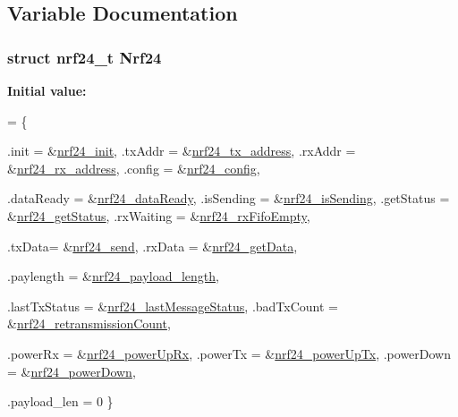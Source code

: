 \subsection{Variable Documentation}
\hypertarget{a00013_a3af53c3fdae3f9bf7246b30d2d66259f}{
\subsubsection[{Nrf24}]{\setlength{\rightskip}{0pt plus 5cm}struct {\bf nrf24\-\_\-t} Nrf24\hspace{0.3cm}{\ttfamily [static]}}}\label{a00013_a3af53c3fdae3f9bf7246b30d2d66259f}
{\bfseries Initial value\-:}
\begin{DoxyCode}
= \{
  
  .init =   &\hyperlink{a00013_a74436d4829a431fcd9b5ef6ff76d0677}{nrf24\_init},
  .txAddr = &\hyperlink{a00013_a17831f7445d7a64fc5f993cb8661ccaa}{nrf24\_tx\_address},
  .rxAddr = &\hyperlink{a00013_a828f90ed30594cc2c29272ce3a0345db}{nrf24\_rx\_address},
  .config = &\hyperlink{a00013_a97793f0c66a9d83e7180e54b6054e366}{nrf24\_config},

  
  .dataReady = &\hyperlink{a00013_a712c0b5e8c339da2e8f36cfbba8892ac}{nrf24\_dataReady},
  .isSending = &\hyperlink{a00013_a126be099971800e98c2c0b0fa6910051}{nrf24\_isSending},
  .getStatus = &\hyperlink{a00013_ab1cbb7a5d39d2d1389156e88d10ff85b}{nrf24\_getStatus},
  .rxWaiting = &\hyperlink{a00013_a9e05723f5fa753cfb2ea219e90eb3c2b}{nrf24\_rxFifoEmpty},

  .txData= &\hyperlink{a00013_ae806a152ba1c40a6c7a62cfbb7b23a64}{nrf24\_send},
  .rxData = &\hyperlink{a00013_a195d164f0c500d345d23ca1dfa3fa0d1}{nrf24\_getData},

  
  .paylength = &\hyperlink{a00013_a2cf62b6425bac2d6f51355a6cf4fe61e}{nrf24\_payload\_length},

   
  .lastTxStatus = &\hyperlink{a00013_a887f428c44dc2efda8a9f701dee6ec34}{nrf24\_lastMessageStatus},
  .badTxCount = &\hyperlink{a00013_ae0f50a459cd34957291713bb002893f8}{nrf24\_retransmissionCount},
    
  
  .powerRx = &\hyperlink{a00013_a5e2122f30566907a73d39598ba99ef08}{nrf24\_powerUpRx},
  .powerTx = &\hyperlink{a00013_a8aa77fbedb60ef1265f451dc400d1489}{nrf24\_powerUpTx},
  .powerDown = &\hyperlink{a00013_ac7b63ad34704615c539accfd00a12ed5}{nrf24\_powerDown},

  .payload\_len = 0
\}
\end{DoxyCode}
